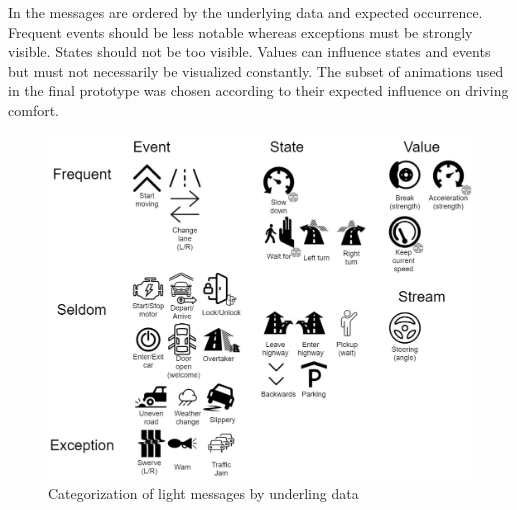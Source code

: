  In  the messages are ordered by the underlying data and expected occurrence. Frequent events should be less notable whereas exceptions must be strongly visible. States should not be too visible. Values can influence states and events but must not necessarily be visualized constantly. The subset of animations used in the final prototype was chosen according to their expected influence on driving comfort. 
\begin{figure}
    \includegraphics[height=0.6\textwidth]{fig/tab-}
    \caption[Light Events]{Categorization of light messages by underling data}
    \label{fig:lightevents}
\end{figure}


